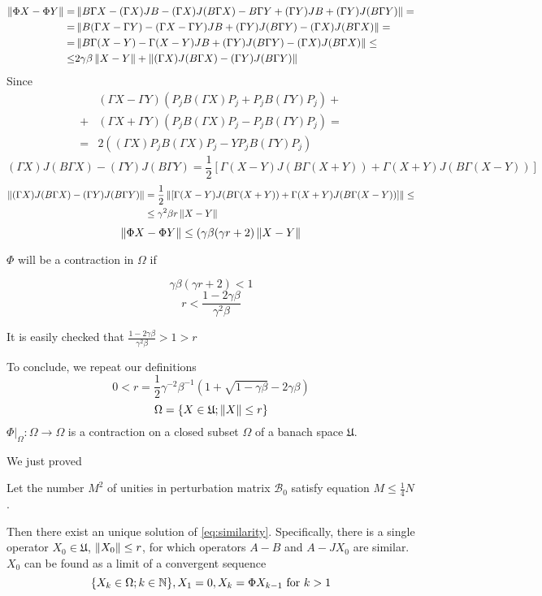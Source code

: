\documentclass{article}
\begin{document}
\begin{align*}
    \left\|{\Phi X - \Phi Y}\right\|
    =& \left\|{B\Gamma X - (\Gamma X)JB - (\Gamma X)J(B\Gamma X) - B\Gamma Y + (\Gamma Y)JB + (\Gamma Y)J(B\Gamma Y)}\right\| = \\
    =& \left\|{B(\Gamma X - \Gamma Y) - (\Gamma X - \Gamma Y) JB + (\Gamma Y) J(B\Gamma Y) - (\Gamma X)J(B\Gamma X)}\right\| = \\
    =& \left\|{B\Gamma(X-Y) - \Gamma(X-Y)JB + (\Gamma Y) J(B\Gamma Y) - (\Gamma X)J(B\Gamma X)}\right\| \leq \\
    \leq& 2\gamma\beta\left\|{X-Y}\right\| + \left\|{(\Gamma X)J(B\Gamma X) - (\Gamma Y) J(B\Gamma Y)}\right\|
\end{align*}
Since 
\begin{align*}
    &(\Gamma X - \Gamma Y)(P_jB(\Gamma X)P_j + P_jB(\Gamma Y)P_j) + \\
    + &(\Gamma X + \Gamma Y)(P_jB(\Gamma X)P_j - P_jB(\Gamma Y)P_j) = \\
= &2((\Gamma X)P_jB(\Gamma X)P_j- YP_jB(\Gamma Y)P_j)\end{align*}
$$(\Gamma X)J(B\Gamma X) - (\Gamma Y) J(B\Gamma Y)
= \frac12\left[\Gamma(X-Y)J(B\Gamma(X+Y)) + \Gamma(X+Y)J(B\Gamma(X-Y))\right]$$
\begin{align*}
    \left\|{(\Gamma X)J(B\Gamma X) - (\Gamma Y) J(B\Gamma Y)}\right\|
    &= \frac12\left\|{\left[\Gamma(X-Y)J(B\Gamma(X+Y)) + \Gamma(X+Y)J(B\Gamma(X-Y))\right]}\right\|\leq \\
    &\leq \gamma^2\beta r \left\|{X-Y}\right\|
\end{align*}
$$\left\|{\Phi X - \Phi Y}\right\| \leq (\gamma\beta(\gamma r + 2)\left\|{X-Y}\right\|$$

$\Phi$ will be a contraction in $\Omega$ if

$$\gamma\beta(\gamma r + 2) < 1$$
$$r < \frac{1-2\gamma\beta}{\gamma^2\beta}$$

It is easily checked that $\frac{1-2\gamma\beta}{\gamma^2\beta}>1>r$

To conclude, we repeat our definitions
$$0< r = \frac12 \gamma^{-2} \beta^{-1} (1 + \sqrt{1-\gamma\beta} - 2\gamma\beta)$$
$$\Omega = \{X\in\mathfrak U; \left\|{X}\right\| \leq r\}$$
$\Phi|_{\Omega}:\Omega\to\Omega$ is a contraction on a closed subset $\Omega$ of a banach space $\mathfrak U$.

We just proved
\begin{thm}
    Let the number $M^2$ of unities in perturbation matrix $\mathcal B_0$ satisfy equation $M \leq \frac14 N$.

    Then there exist an unique solution of \eqref{eq:similarity}.
    Specifically, there is a single operator $X_0\in\mathfrak U$, $\left\|{X_0}\right\| \leq r$,
    for which operators $A-B$ and $A-JX_0$ are similar.
    $X_0$ can be found as a limit of a convergent sequence
    $$\{X_k\in\Omega; k\in\mathbb{N}\}, X_1 = 0, X_k = \Phi X_{k-1} \text{ for } k>1$$
\end{thm}
\end{document}
